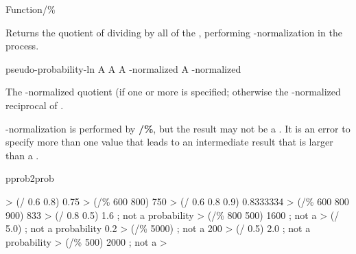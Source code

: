\documentclass[10pt,twoside,english,pdftex]{article}
\begin{document}
\begin{functiondoc}{Function}{/\%}%
  {\superstar{}
    \returns{} }
%

\fnsyntax
\fnalternate{\textbf{/\%}}%
  {
    \returns{} }

  \fnpurpose Returns the quotient of dividing
   by all of the
  , performing
  -normalization in the process.

\fnpackage {}

\fnmodule {}

\fnargs
\begin{args}{pseudo-probability-ln}
 A  
 A  
\arg[quotient] A -normalized 
\arg[reciprocal] A -normalized 
\end{args}

\fnreturns The -normalized
 quotient (if one or more
 is specified; otherwise the
-normalized  reciprocal
of .

\fndescription
%
-normalization is performed by \textbf{/\%}, but the
 result may not be a .
It is an error to specify more than one
 value that leads to an
intermediate result that is larger than a .

\begin{alsos}{pprob2prob}
\also[*\%]
\end{alsos}

\fnexamples
\begin{example}
%
\W\supp
  > (/ 0.6 0.8)
  0.75
  > (/\% 600 800)
  750
  > (/ 0.6 0.8 0.9)
  0.8333334
  > (/\% 600 800 900)
  833
  > (/ 0.8 0.5)
  1.6          ; not a probability
  > (/\% 800 500)
  1600         ; not a 
  > (/ 5.0)    ; not a probability
  0.2          
  > (/\% 5000)  ; not a 
  200          
  > (/ 0.5)
  2.0          ; not a probability
  > (/\% 500)
  2000         ; not a 
  > 
\end{example}

\end{functiondoc}
\end{document}
